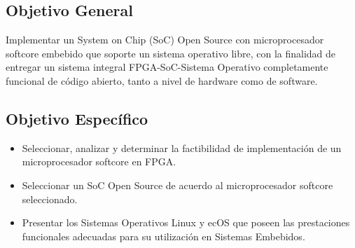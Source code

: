 \subsection{Objetivo General}
\par
Implementar un System on Chip (SoC) Open Source con microprocesador softcore embebido que soporte un sistema operativo libre, con la finalidad de
entregar un sistema integral FPGA-SoC-Sistema Operativo completamente funcional de código abierto, tanto a nivel de hardware como de software.

\subsection{Objetivo Específico}
\begin{itemize}
\item Seleccionar, analizar y determinar la factibilidad de implementación de un microprocesador softcore en FPGA.
\item Seleccionar un SoC Open Source de acuerdo al microprocesador softcore seleccionado.
\item Presentar los Sistemas Operativos Linux y ecOS que poseen las prestaciones funcionales adecuadas para su utilización en Sistemas
Embebidos.
\end{itemize}

